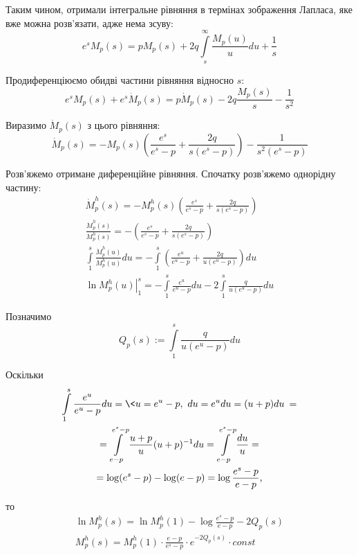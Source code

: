 Таким чином, отримали інтегральне рівняння в термінах зображення Лапласа, яке вже можна розв'язати, адже нема зсуву:
\begin{equation}
\label{eq:model_laplace_integral}
e^s M_{p}(s) = p M_{p}(s) + 2q \int\limits_s^\infty \frac{M_{p}(u)}{u} du + \frac{1}{s}
\end{equation}

Продиференціюємо обидві частини рівняння відносно $s$:
\begin{equation}
e^s M_{p}(s) + e^s \dot M_{p}(s) =p \dot M_{p}(s) - 2 q \frac{M_{p}(s)}{s}  - \frac1{s^2}
\end{equation}

Виразимо $\dot M_{p}(s)$ з цього рівняння:
\begin{equation}
\label{eq:model_laplace_diff}
\dot M_{p}(s) = - M_{p}(s)\left(\frac{e^s}{e^s - p} + \frac{2q}{s(e^s - p)}\right) - \frac{1}{s^2(e^s - p)}
\end{equation}

Розв'яжемо отримане диференційне рівняння. Спочатку розв'яжемо однорідну частину:
\begin{gather*}
\dot M_{p}^{h} (s) = - M_{p}^{h} (s)\left(\frac{e^s}{e^s - p} + \frac{2q}{s(e^s - p)}\right) \\
\frac{\dot M_{p}^{h} (s)}{M_{p}^{h} (s)} = -\left(\frac{e^s}{e^s - p} + \frac{2q}{s(e^s - p)}\right) \\
\int\limits_1^s \frac{\dot M_{p}^{h} (u)}{M_{p}^{h} (u)} du = -\int\limits_1^s \left(\frac{e^u}{e^u - p} + \frac{2q}{u(e^u - p)}\right) du \\
\left. \ln{M_{p}^{h} (u)}\right|_1^s = - \int\limits_1^s \frac{e^u}{e^u - p} du  - 2 \int\limits_1^s \frac{q}{u(e^u - p)} du
\end{gather*}

Позначимо
\begin{equation}
\label{eq:partial_li_p}
Q_p(s) := \int\limits_1^s \frac{q}{u(e^u - p)} du
\end{equation}

Оскільки
\begin{gather*}
\int\limits_1^s \frac{e^u}{e^u - p} du = \< u = e^u - p,~ du = e^u du = (u+p) du \> = \\
= \int\limits_{e-p}^{e^s -p} \frac{u + p}{u} (u+p)^{-1} du = 
\int\limits_{e-p}^{e^s -p} \frac{du}{u} = \\
= \log(e^s - p) - \log(e-p) = \log \frac{e^s - p}{e - p} \text{,}
\end{gather*}

то
\begin{gather*}
\ln{M_{p}^{h} (s)} = \ln{M_{p}^{h} (1)} - \log \frac{e^s - p}{e - p} - 2Q_p(s) \\
M_{p}^{h} (s) = M_{p}^{h} (1) \cdot \frac{e - p}{e^s - p} \cdot e^{- 2Q_p(s)} \cdot const
\end{gather*}

